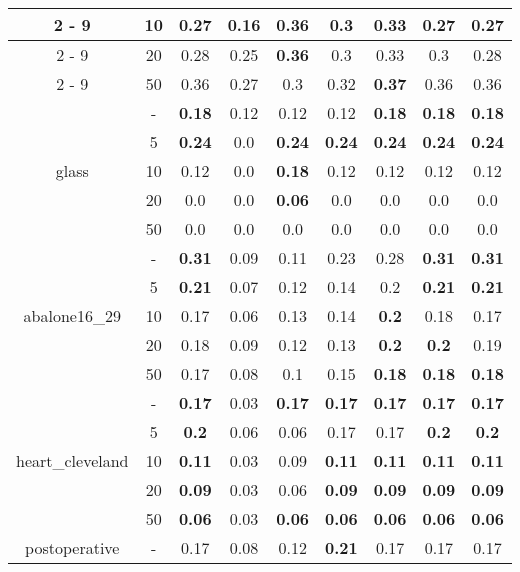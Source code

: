\begin{table}[H]
\begin{center}
{\begin{tabular}{c|c|ccccccc}
				\cline{2%
					-%
					9}%
				&10&0.27&0.16&\textbf{0.36}&0.3&0.33&0.27&0.27\\%
				\cline{2%
					-%
					9}%
				&20&0.28&0.25&\textbf{0.36}&0.3&0.33&0.3&0.28\\%
				\cline{2%
					-%
					9}%
				&50&0.36&0.27&0.3&0.32&\textbf{0.37}&0.36&0.36\\%
				\hline%
				\multirow{5}{*}{glass}&{-}&\textbf{0.18}&0.12&0.12&0.12&\textbf{0.18}&\textbf{0.18}&\textbf{0.18}\\%
				\cline{2%
					-%
					9}%
				&5&\textbf{0.24}&0.0&\textbf{0.24}&\textbf{0.24}&\textbf{0.24}&\textbf{0.24}&\textbf{0.24}\\%
				\cline{2%
					-%
					9}%
				&10&0.12&0.0&\textbf{0.18}&0.12&0.12&0.12&0.12\\%
				\cline{2%
					-%
					9}%
				&20&0.0&0.0&\textbf{0.06}&0.0&0.0&0.0&0.0\\%
				\cline{2%
					-%
					9}%
				&50&0.0&0.0&0.0&0.0&0.0&0.0&0.0\\%
				\hline%
				\multirow{5}{*}{abalone16\_29}&{-}&\textbf{0.31}&0.09&0.11&0.23&0.28&\textbf{0.31}&\textbf{0.31}\\%
				\cline{2%
					-%
					9}%
				&5&\textbf{0.21}&0.07&0.12&0.14&0.2&\textbf{0.21}&\textbf{0.21}\\%
				\cline{2%
					-%
					9}%
				&10&0.17&0.06&0.13&0.14&\textbf{0.2}&0.18&0.17\\%
				\cline{2%
					-%
					9}%
				&20&0.18&0.09&0.12&0.13&\textbf{0.2}&\textbf{0.2}&0.19\\%
				\cline{2%
					-%
					9}%
				&50&0.17&0.08&0.1&0.15&\textbf{0.18}&\textbf{0.18}&\textbf{0.18}\\%
				\hline%
				\multirow{5}{*}{heart\_cleveland}&{-}&\textbf{0.17}&0.03&\textbf{0.17}&\textbf{0.17}&\textbf{0.17}&\textbf{0.17}&\textbf{0.17}\\%
				\cline{2%
					-%
					9}%
				&5&\textbf{0.2}&0.06&0.06&0.17&0.17&\textbf{0.2}&\textbf{0.2}\\%
				\cline{2%
					-%
					9}%
				&10&\textbf{0.11}&0.03&0.09&\textbf{0.11}&\textbf{0.11}&\textbf{0.11}&\textbf{0.11}\\%
				\cline{2%
					-%
					9}%
				&20&\textbf{0.09}&0.03&0.06&\textbf{0.09}&\textbf{0.09}&\textbf{0.09}&\textbf{0.09}\\%
				\cline{2%
					-%
					9}%
				&50&\textbf{0.06}&0.03&\textbf{0.06}&\textbf{0.06}&\textbf{0.06}&\textbf{0.06}&\textbf{0.06}\\%
				\hline%
				\multirow{5}{*}{postoperative}&{-}&0.17&0.08&0.12&\textbf{0.21}&0.17&0.17&0.17\\%

\end{tabular}}
\end{center}
\end{table}
